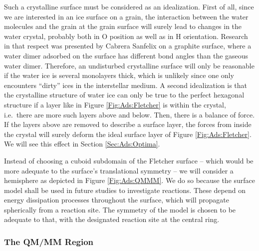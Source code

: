 Such a crystalline surface must be considered as an idealization. First of all,
since we are interested in an ice surface on a grain, the interaction between
the water molecules and the grain at the grain surface will surely lead to
changes in the water crystal, probably both in O position as well as in H
orientation.
Research in that respect was presented by Cabrera Sanfelix
\etal\cite{CabreraSanfelix2003} on a graphite surface, where a water dimer
adsorbed on the surface has different bond angles than the gaseous water dimer.
Therefore, an undisturbed crystalline surface will only be reasonable if the
water ice is several monolayers thick, which is unlikely since one only
encounters ``dirty'' ices in the interstellar
medium.\cite{BoogertGerakinesWhittet2015} A second idealization is that the crystalline structure of water ice can only be true to the perfect hexagonal structure if a layer like
in Figure \ref{Fig:Ads:Fletcher} is within the crystal, i.e.\ there are more
such layers above and below. Then, there is a balance of force. If the layers
above are removed to describe a surface layer, the forces from inside the
crystal will surely deform the ideal surface layer of Figure
\ref{Fig:Ads:Fletcher}.
We will see this effect in Section \ref{Sec:Ads:Optima}.

Instead of choosing a cuboid subdomain of the Fletcher surface -- which would be more adequate
to the surface's translational symmetry -- we will consider a hemisphere as depicted in Figure
\ref{Fig:Ads:QMMM}. We do so because the surface model shall be used in future studies
to investigate reactions. These depend on energy dissipation processes throughout the
surface, which will propagate spherically from a reaction site. The symmetry of the model
is chosen to be adequate to that, with the designated reaction site at the
central ring.

\subsubsection{The QM/MM Region}
\label{Sec:Ads:QM/MM}

